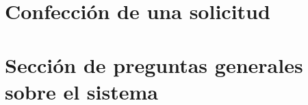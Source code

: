 \documentclass{iccmemoria}
\begin{document}
%


%









\appendixpart

\label{sec: Anexo_A}
	\section{Confección de una solicitud}
	
	
	
	

\label{sec: Anexo_B}

	\section{Sección de preguntas generales sobre el sistema}
	
	
	


\end{document}
